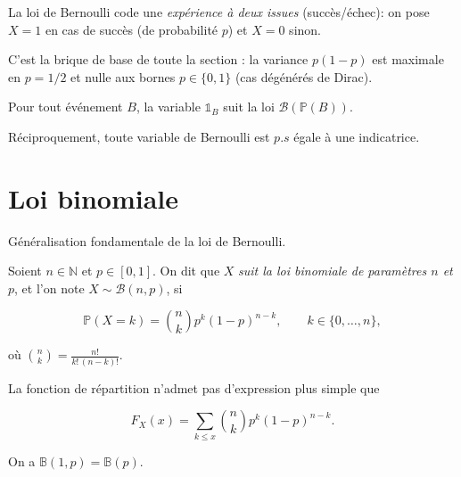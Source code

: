 \begin{remarque}[Interprétation]
La loi de Bernoulli code une \emph{expérience à deux issues} (succès/échec): on pose $X=1$ en cas de succès (de probabilité $p$) et $X=0$ sinon. 

C'est la brique de base de toute la section : la variance $p(1-p)$ est maximale en $p=1/2$ et nulle aux bornes $p\in\{0,1\}$ (cas dégénérés de Dirac).
\end{remarque}

\begin{mdframed}
\begin{proposition}
Pour tout événement $B$, la variable $\mathbb{1}_B$ suit la loi $\mathcal{B}(\mathbb{P}(B))$.

Réciproquement, toute variable de Bernoulli est $p.s$ égale à une indicatrice.
\end{proposition}
\end{mdframed}

\section{Loi binomiale}

Généralisation fondamentale de la loi de Bernoulli.

\medskip

\begin{mdframed}
\begin{definition}
Soient $n\in \mathbb{N}$ et $p\in[0,1]$. On dit que $X$ \textit{suit la loi binomiale de paramètres $n$ et $p$}, et l'on note $X\sim \mathcal{B}(n,p)$, si

$$
  \mathbb{P}(X=k)=\binom{n}{k}p^k(1-p)^{n-k},\qquad k\in\{0,\dots,n\},
$$

où $\binom{n}{k}=\frac{n!}{k!\,(n-k)!}$.
\end{definition}
\end{mdframed}

\medskip

\begin{mdframed}
\begin{proposition}
La fonction de répartition n'admet pas d'expression plus simple que

$$
F_X(x)=\sum_{k\le x}\binom{n}{k}p^k(1-p)^{n-k}.
$$ 

On a $\mathbb{B}(1,p)=\mathbb{B}(p)$.
\end{proposition}
\end{mdframed}

